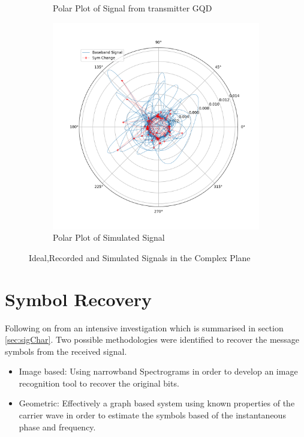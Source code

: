 \begin{figure}[H]
\begin{subfigure}[b]{0.4\textwidth}
        \caption{\centering Polar Plot of Signal from transmitter GQD}
        \label{fig:polarreal}
    \end{subfigure}
        \begin{subfigure}[b]{0.4\textwidth}
        \centering
       \includegraphics[width = \textwidth]{figs/sim/veri/PolarSim.png}
        \caption{Polar Plot of Simulated Signal}
        \label{fig:polarSim}
    \end{subfigure}
    \caption{Ideal,Recorded and Simulated Signals in the Complex Plane}
    \label{fig:polar}
\end{figure}


\pagebreak
\section{Symbol Recovery}
Following on from an intensive investigation which is summarised in section \ref{sec:sigChar}. Two possible methodologies were identified to recover the message symbols from the received signal.

\begin{itemize}
    \item Image based: Using narrowband Spectrograms in order to develop an image recognition tool to recover the original bits.
    \item Geometric: Effectively a graph based system using known properties of the carrier wave in order to estimate the symbols based of the instantaneous phase and frequency.
\end{itemize}

